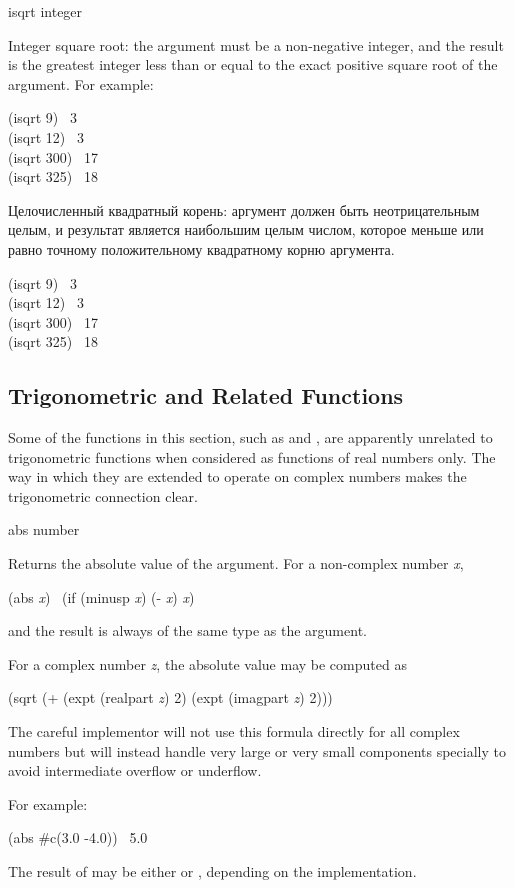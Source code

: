 \begin{defun}[Function]
isqrt integer

Integer square root: the argument must be a non-negative integer, and the
result is the greatest integer less than or equal to the exact positive
square root of the argument.
For example:
\begin{lisp}
(isqrt 9) \EV\ 3 \\
(isqrt 12) \EV\ 3 \\
(isqrt 300) \EV\ 17 \\
(isqrt 325) \EV\ 18
\end{lisp}

Целочисленный квадратный корень: аргумент должен быть неотрицательным целым, и
результат является наибольшим целым числом, которое меньше или равно точному
положительному квадратному корню аргумента.
\begin{lisp}
(isqrt 9) \EV\ 3 \\
(isqrt 12) \EV\ 3 \\
(isqrt 300) \EV\ 17 \\
(isqrt 325) \EV\ 18
\end{lisp}
\end{defun}

\subsection{Trigonometric and Related Functions}

Some of the functions in this section, such as 
and , are apparently unrelated
to trigonometric functions when considered as functions of
real numbers only.  The way in which they are extended to
operate on complex numbers makes the trigonometric connection clear.

\begin{defun}[Function]
abs number

Returns the absolute value of the argument.  For a non-complex number \emph{x},
\begin{lisp}
(abs \emph{x}) \EQ\ (if (minusp \emph{x}) (- \emph{x}) \emph{x})
\end{lisp}
and the result is always of the same type as the argument.

For a complex number \emph{z}, the absolute value may be computed as
\begin{lisp}
(sqrt (+ (expt (realpart \emph{z}) 2) (expt (imagpart \emph{z}) 2)))
\end{lisp}

\beforenoterule
\begin{implementation}
The careful implementor will not use this formula directly
for all complex numbers
but will instead handle very large or very small components specially
to avoid intermediate overflow or underflow.
\end{implementation}
\afternoterule

For example:
\begin{lisp}
(abs \#c(3.0 -4.0)) \EV\ 5.0
\end{lisp}
The result of  may be either  or ,
depending on the implementation.
\end{defun}

